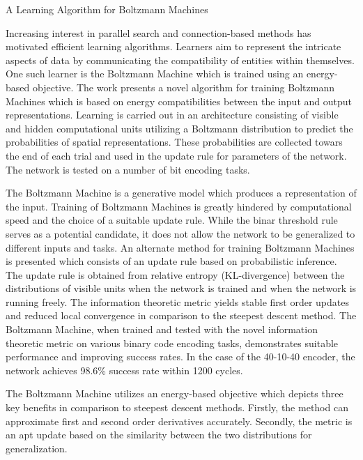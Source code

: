 \documentclass[11pt,letterpaper]{article}
\begin{document}
\begin{center}
  \large{A Learning Algorithm for Boltzmann Machines}
\end{center}


Increasing interest in parallel search and connection-based methods has motivated efficient learning algorithms. Learners aim to represent the intricate aspects of data by communicating the compatibility of entities within themselves. One such learner is the Boltzmann Machine which is trained using an energy-based objective. The work presents a novel algorithm for training Boltzmann Machines which is based on energy compatibilities between the input and output representations. Learning is carried out in an architecture consisting of visible and hidden computational units utilizing a Boltzmann distribution to predict the probabilities of spatial representations. These probabilities are collected towars the end of each trial and used in the update rule for parameters of the network. The network is tested on a number of bit encoding tasks. 

The Boltzmann Machine is a generative model which produces a representation of the input. Training of Boltzmann Machines is greatly hindered by computational speed and the choice of a suitable update rule. While the binar threshold rule serves as a potential candidate, it does not allow the network to be generalized to different inputs and tasks. An alternate method for training Boltzmann Machines is presented which consists of an update rule based on probabilistic inference. The update rule is obtained from relative entropy (KL-divergence) between the distributions of visible units when the network is trained and when the network is running freely. The information theoretic metric yields stable first order updates and reduced local convergence in comparison to the steepest descent method. The Boltzmann Machine, when trained and tested with the novel information theoretic metric on various binary code encoding tasks, demonstrates suitable performance and improving success rates. In the case of the 40-10-40 encoder, the network achieves 98.6\% success rate within 1200 cycles. 


The Boltzmann Machine utilizes an energy-based objective which depicts three key benefits in comparison to steepest descent methods. Firstly, the method can approximate first and second order derivatives accurately. Secondly, the metric is an apt update based on the similarity between the two distributions for generalization. 
\end{document}
